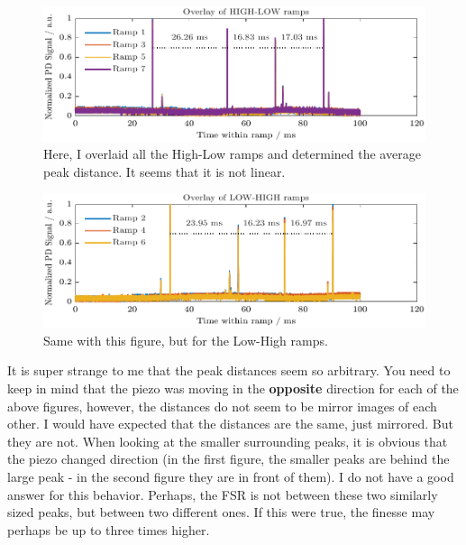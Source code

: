 \newpage

\begin{figure}[H]
    \centering
    \includegraphics[width=\textwidth]{ManyRamp/HiLo.pdf}
    \caption{Here, I overlaid all the High-Low ramps and determined the average peak distance. It seems that it is not linear.}
\end{figure}

\begin{figure}[H]
    \centering
    \includegraphics[width=\textwidth]{ManyRamp/LoHi.pdf}
    \caption{Same with this figure, but for the Low-High ramps.}
\end{figure}

It is super strange to me that the peak distances seem so arbitrary. 
You need to keep in mind that the piezo was moving in the \textbf{opposite} direction for each of the above figures, however, the distances do not seem to be mirror images of each other.
I would have expected that the distances are the same, just mirrored. But they are not.
When looking at the smaller surrounding peaks, it is obvious that the piezo changed direction (in the first figure, the smaller peaks are behind the large peak - in the second figure they are in front of them).
I do not have a good answer for this behavior. Perhaps, the FSR is not between these two similarly sized peaks, but between two different ones.
If this were true, the finesse may perhaps be up to three times higher.
\newpage
